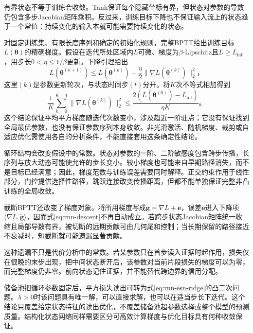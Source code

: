 有界状态不等于训练会收敛。Tanh保证每个隐藏坐标有界，但状态对参数的导数仍包含多步Jacobian矩阵乘积。反过来，训练目标下降也不保证输入流上的状态趋于一个常值：持续变化的输入本就可能需要持续变化的状态。

对固定训练集、有限长度序列和确定的初始化规则，完整BPTT给出训练目标$L(\bm{\theta})$的精确梯度。假设在迭代所处区域内$L$可微、梯度为$\beta$-Lipschitz且$L\geq L_{\inf}$，用步长$0<\eta\leq1/\beta$更新。下降引理给出
\begin{equation}
  L(\bm{\theta}^{(k+1)})
    \leq L(\bm{\theta}^{(k)})
       -\frac{\eta}{2}\lVert\nabla L(\bm{\theta}^{(k)})\rVert_2^2\text{，}
  \label{eq:rnn-descent}
\end{equation}
这里$(k)$是参数更新轮次，与状态时间步$(t)$分开。将$K$次不等式相加得到
\begin{equation}
  \frac{1}{K}\sum_{k=0}^{K-1}
     \lVert\nabla L(\bm{\theta}^{(k)})\rVert_2^2
     \leq\frac{2\left(L(\bm{\theta}^{(0)})-L_{\inf}\right)}{\eta K}\text{。}
  \label{eq:rnn-stationarity}
\end{equation}
这个结论保证平均平方梯度随迭代次数变小，涉及趋近一阶驻点；它没有保证找到全局最优参数，也没有保证参数序列本身收敛。非光滑激活、随机梯度、裁剪或自适应优化需使用各自的分析条件，不能直接套用这条确定性结论。

循环结构会改变假设中的常数。状态对参数的一阶、二阶敏感度包含跨步传播，长序列与放大动态可能使允许的步长变小。较小梯度也可能来自早期路径消失，而不是目标已经满意；因此，梯度范数与训练误差需要同时解释。正交约束作用于线性部分，门控提供选择性路径，跳跃连接改变传播距离，但都不能单独保证完整非凸训练的全局收敛。

截断BPTT还改变了梯度对象。将所用梯度写成$\widetilde{\bm{g}}=\nabla L+\bm{e}$，误差$\bm{e}$进入下降项$\langle\nabla L,\widetilde{\bm{g}}\rangle$，因而式\eqref{eq:rnn-descent}不再自动成立。若跨步状态Jacobian矩阵统一收缩且局部导数有界，被切断的远期贡献可由几何尾和控制；当长期保留的路径接近不衰减时，短截断就可能遗漏显著贡献。

这种遗漏不只是代价分析中的常数。若某参数只在首步读入证据时起作用，损失仅在很晚的末步出现，把中间状态断开后，该参数对当前片段损失的梯度可以为零，而完整梯度仍非零。前向状态记住证据，并不能替代跨边界的信用分配。

储备池把循环参数固定后，平方损失读出可转为式\eqref{eq:rnn-esn-ridge}的凸二次问题。$\lambda>0$时该问题具有唯一解，可以直接求解，也可以在适当步长下迭代。这个结论只覆盖给定状态特征的读出优化，不覆盖储备池超参数选择或整个模型的预测质量。结构化状态网络同样需要区分可高效计算梯度与优化目标具有何种收敛保证。

